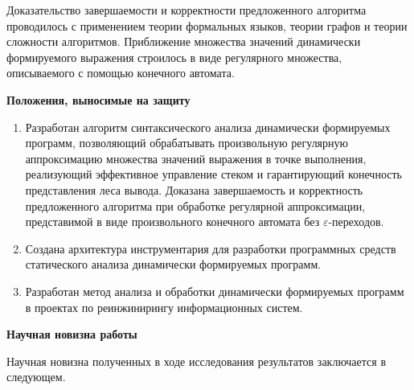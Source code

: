 Доказательство завершаемости и корректности предложенного алгоритма проводилось с применением теории формальных языков, теории графов и теории сложности алгоритмов. Приближение множества значений динамически формируемого выражения строилось в виде регулярного множества, описываемого с помощью конечного автомата.


\textbf{Положения, выносимые на защиту}
\begin{enumerate}
    \item Разработан алгоритм синтаксического анализа динамически формируемых программ, позволяющий обрабатывать произвольную регулярную аппроксимацию множества значений выражения в точке выполнения, реализующий эффективное управление стеком и гарантирующий конечность представления леса вывода. Доказана завершаемость и корректность предложенного алгоритма при обработке регулярной аппроксимации, представимой в виде произвольного конечного автомата без $\varepsilon$-переходов. 
    \item Создана архитектура инструментария для разработки программных средств статического анализа динамически формируемых программ.
    \item Разработан метод анализа и обработки динамически формируемых программ в проектах по реинжинирингу информационных систем. 
\end{enumerate}

\textbf{Научная новизна работы}

Научная новизна полученных в ходе исследования результатов заключается в следующем.

